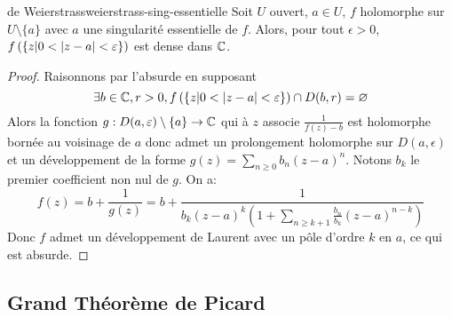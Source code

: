 \documentclass{cours}
\begin{document}
\begin{théorème}
	{de Weierstrass}{weierstrass-sing-essentielle}
	Soit $U$ ouvert, $a \in U$, $f$ holomorphe sur $U \setminus \{a\}$ avec $a$ une singularité essentielle de $f$. 
	Alors, pour tout $\epsilon > 0$, $f\left(\left\{z \middle| 0 < \left|z - a\right| < \varepsilon\right\}\right)$ est dense dans $\mathbb{C}$. 
\end{théorème}
\begin{proof}
	Raisonnons par l'absurde en supposant 
	\begin{equation*}
		\exists b \in \mathbb{C}, r > 0, f\left(\left\{z \middle| 0 < \left|z - a\right| < \varepsilon\right\}\right) \cap D(b, r) = \varnothing
	\end{equation*}
	Alors la fonction $g : D(a, \varepsilon) \setminus \{a\} \to \mathbb{C}$ qui à $z$ associe $\frac{1}{f(z) - b}$ est holomorphe bornée au voisinage de $a$ donc admet un prolongement holomorphe sur $D(a, \epsilon)$ et un développement de la forme $g(z) = \sum_{n \geq 0} b_{n} \left(z - a\right)^{n}$. 
	Notons $b_{k}$ le premier coefficient non nul de $g$. On a: 
	\begin{equation*}
		f(z) = b + \frac{1}{g(z)} = b + \frac{1}{b_{k}(z - a)^{k}\left(1 + \sum_{n \geq k + 1} \frac{b_{n}}{b_{k}}(z - a)^{n-k}\right)}
	\end{equation*}
	Donc $f$ admet un développement de Laurent avec un pôle d'ordre $k$ en $a$, ce qui est absurde.
\end{proof}

\subsection{Grand Théorème de Picard} 
\end{document}
